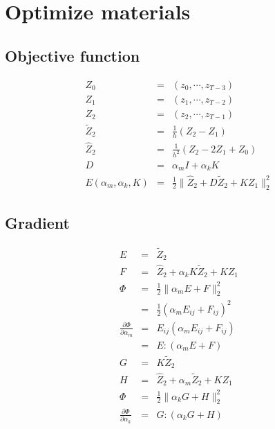\documentclass[9pt,twocolumn]{extarticle}
\begin{document}
\section{Optimize materials}
\subsection{Objective function}
\begin{eqnarray*}
  Z_0 &=& (z_0,\cdots,z_{T-3})\\
  Z_1 &=& (z_1,\cdots,z_{T-2})\\
  Z_2 &=& (z_2,\cdots,z_{T-1})\\
  \tilde{Z}_2 &=& \frac{1}{h}(Z_2-Z_1)\\
  \hat{Z}_2 &=& \frac{1}{h^2}(Z_2-2Z_1+Z_0)\\
  D &=& \alpha_mI+\alpha_kK\\
  E(\alpha_m,\alpha_k,K)&=&\frac{1}{2}\|\hat{Z}_2+D\tilde{Z}_2+KZ_1\|_2^2
\end{eqnarray*}

\subsection{Gradient}
\begin{eqnarray*}
  E &=& \tilde{Z}_2 \\
  F &=& \hat{Z}_2+\alpha_kK\tilde{Z}_2+KZ_1\\
  \Phi &=& \frac{1}{2}\|\alpha_mE+F\|_2^2 \\
  &=&\frac{1}{2}(\alpha_mE_{i{ }j}+F_{i{ }j})^2\\
  \frac{\partial{\Phi}}{\partial{\alpha_m}} &=&
  E_{i{ }j}(\alpha_mE_{i{ }j}+F_{i{ }j})\\
  &=&E:(\alpha_mE+F)\\
  G &=& K\tilde{Z}_2\\
  H &=& \hat{Z}_2+\alpha_m\tilde{Z}_2+KZ_1\\
  \Phi &=& \frac{1}{2}\|\alpha_kG+H\|_2^2\\
  \frac{\partial{\Phi}}{\partial{\alpha_k}} &=&G:(\alpha_kG+H)
\end{eqnarray*}
\end{document}
